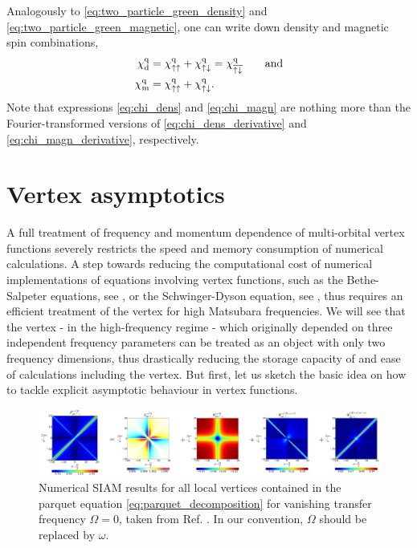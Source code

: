 \documentclass[../../main.tex]{subfiles}
\begin{document}
Analogously to \eqref{eq:two_particle_green_density} and \eqref{eq:two_particle_green_magnetic}, one can write down density and magnetic spin combinations,
\begin{subequations}
\begin{align}
	\chi_{\text{d}}^{\text{q}}&=\chi_{\uparrow\uparrow}^{\text{q}}+\chi_{\uparrow\downarrow}^{\text{q}}=\chi_{\overline{\uparrow\downarrow}}^{\text{q}}\qquad\text{and}\label{eq:chi_dens}\\
	\chi_{\text{m}}^{\text{q}}&=\chi_{\uparrow\uparrow}^{\text{q}}+\chi_{\uparrow\downarrow}^{\text{q}}.\label{eq:chi_magn}
\end{align}
\end{subequations}
Note that expressions \eqref{eq:chi_dens} and \eqref{eq:chi_magn} are nothing more than the Fourier-transformed versions of \eqref{eq:chi_dens_derivative} and \eqref{eq:chi_magn_derivative}, respectively.

\section{Vertex asymptotics}\label{sec:vertex_asymptotics}

A full treatment of frequency and momentum dependence of multi-orbital vertex functions severely restricts the speed and memory consumption of numerical calculations. A step towards reducing the computational cost of numerical implementations of equations involving vertex functions, such as the Bethe-Salpeter equations, see , or the Schwinger-Dyson equation, see , thus requires an efficient treatment of the vertex for high Matsubara frequencies. We will see that the vertex - in the high-frequency regime - which originally depended on three independent frequency parameters can be treated as an object with only two frequency dimensions, thus drastically reducing the storage capacity of and ease of calculations including the vertex. But first, let us sketch the basic idea on how to tackle explicit asymptotic behaviour in vertex functions.
\begin{figure}[ht!]
	\centering
	\includegraphics[width=\linewidth]{../../Graphics/vertex_asymptotics_paper.png}
	\caption{Numerical SIAM results for all local vertices contained in the parquet equation \eqref{eq:parquet_decomposition} for vanishing transfer frequency $\Omega=0$, taken from Ref. \cite{high-freq asympt}. In our convention, $\Omega$ should be replaced by $\omega$.}
	\label{fig:full_vertex_siam_results_paper}
\end{figure}
\end{document}
